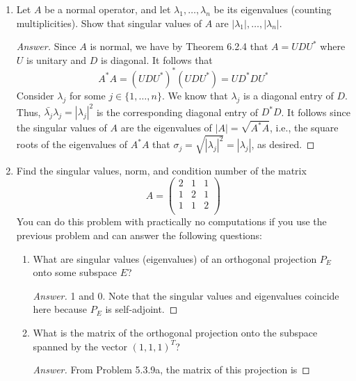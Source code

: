 \documentclass[../psets.tex]{subfiles}
\begin{document}
\begin{enumerate}[label={\textbf{4.\arabic*.}}]
    \item Let $A$ be a normal operator, and let $\lambda_1,\dots,\lambda_n$ be its eigenvalues (counting multiplicities). Show that singular values of $A$ are $|\lambda_1|,\dots,|\lambda_n|$.
    \begin{proof}[Answer]
        Since $A$ is normal, we have by Theorem 6.2.4 that $A=UDU^*$ where $U$ is unitary and $D$ is diagonal. It follows that
        \begin{equation*}
            A^*A = (UDU^*)^*(UDU^*) = UD^*DU^*
        \end{equation*}
        Consider $\lambda_j$ for some $j\in\{1,\dots,n\}$. We know that $\lambda_j$ is a diagonal entry of $D$. Thus, $\bar{\lambda_j}\lambda_j=|\lambda_j|^2$ is the corresponding diagonal entry of $D^*D$. It follows since the singular values of $A$ are the eigenvalues of $|A|=\sqrt{A^*A}$, i.e., the square roots of the eigenvalues of $A^*A$ that $\sigma_j=\sqrt{|\lambda_j|^2}=|\lambda_j|$, as desired.
    \end{proof}
    \item Find the singular values, norm, and condition number of the matrix
    \begin{equation*}
        A =
        \begin{pmatrix}
            2 & 1 & 1\\
            1 & 2 & 1\\
            1 & 1 & 2\\
        \end{pmatrix}
    \end{equation*}
    You can do this problem with practically no computations if you use the previous problem and can answer the following questions:
    \begin{enumerate}
        \item What are singular values (eigenvalues) of an orthogonal projection $P_E$ onto some subspace $E$?
        \begin{proof}[Answer]
            1 and 0. Note that the singular values and eigenvalues coincide here because $P_E$ is self-adjoint.
        \end{proof}
        \item What is the matrix of the orthogonal projection onto the subspace spanned by the vector $(1,1,1)^T$?
        \begin{proof}[Answer]
            From Problem 5.3.9a, the matrix of this projection is

\end{proof}
\end{enumerate}
\end{enumerate}
\end{document}
